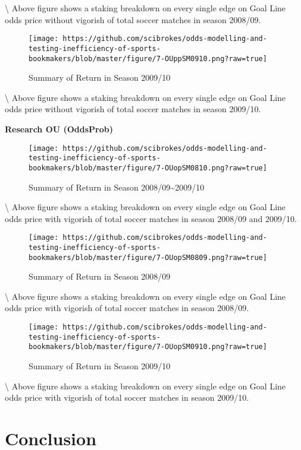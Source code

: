 \documentclass[article]{jss}
\begin{document}
\textbackslash{} Above figure shows a staking breakdown on every single
edge on Goal Line odds price without vigorish of total soccer matches in
season 2008/09.

\begin{figure}[htbp]
\centering
\texttt{[image: https://github.com/scibrokes/odds-modelling-and-testing-inefficiency-of-sports-bookmakers/blob/master/figure/7-OUppSM0910.png?raw=true]}
\caption{Summary of Return in Season 2009/10}
\end{figure}

\textbackslash{} Above figure shows a staking breakdown on every single
edge on Goal Line odds price without vigorish of total soccer matches in
season 2009/10. \bigbreak

\textbf{Research OU (OddsProb)} \bigbreak

\begin{figure}[htbp]
\centering
\texttt{[image: https://github.com/scibrokes/odds-modelling-and-testing-inefficiency-of-sports-bookmakers/blob/master/figure/7-OUopSM0810.png?raw=true]}
\caption{Summary of Return in Season 2008/09\textasciitilde{}2009/10}
\end{figure}

\textbackslash{} Above figure shows a staking breakdown on every single
edge on Goal Line odds price with vigorish of total soccer matches in
season 2008/09 and 2009/10.

\begin{figure}[htbp]
\centering
\texttt{[image: https://github.com/scibrokes/odds-modelling-and-testing-inefficiency-of-sports-bookmakers/blob/master/figure/7-OUopSM0809.png?raw=true]}
\caption{Summary of Return in Season 2008/09}
\end{figure}

\textbackslash{} Above figure shows a staking breakdown on every single
edge on Goal Line odds price with vigorish of total soccer matches in
season 2008/09.

\begin{figure}[htbp]
\centering
\texttt{[image: https://github.com/scibrokes/odds-modelling-and-testing-inefficiency-of-sports-bookmakers/blob/master/figure/7-OUopSM0910.png?raw=true]}
\caption{Summary of Return in Season 2009/10}
\end{figure}

\textbackslash{} Above figure shows a staking breakdown on every single
edge on Goal Line odds price with vigorish of total soccer matches in
season 2009/10.

\section{Conclusion}\label{conclusion}
\end{document}
